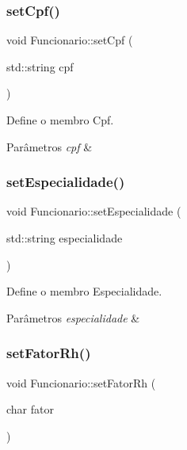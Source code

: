 \subsubsection{\texorpdfstring{set\+Cpf()}{setCpf()}}
{\footnotesize\ttfamily void Funcionario\+::set\+Cpf (\begin{DoxyParamCaption}\item[{std\+::string}]{cpf }\end{DoxyParamCaption})}



Define o membro Cpf. 


\begin{DoxyParams}{Parâmetros}
{\em cpf} & \\
\hline
\end{DoxyParams}
\mbox{\label{classFuncionario_ae412312aaaaceaca6dd132e8397b283f}} 
\subsubsection{\texorpdfstring{set\+Especialidade()}{setEspecialidade()}}
{\footnotesize\ttfamily void Funcionario\+::set\+Especialidade (\begin{DoxyParamCaption}\item[{std\+::string}]{especialidade }\end{DoxyParamCaption})}



Define o membro Especialidade. 


\begin{DoxyParams}{Parâmetros}
{\em especialidade} & \\
\hline
\end{DoxyParams}
\mbox{\label{classFuncionario_aa8a9bab437eb41578fe514f26c16e5d2}} 
\subsubsection{\texorpdfstring{set\+Fator\+Rh()}{setFatorRh()}}
{\footnotesize\ttfamily void Funcionario\+::set\+Fator\+Rh (\begin{DoxyParamCaption}\item[{char}]{fator }\end{DoxyParamCaption})}



